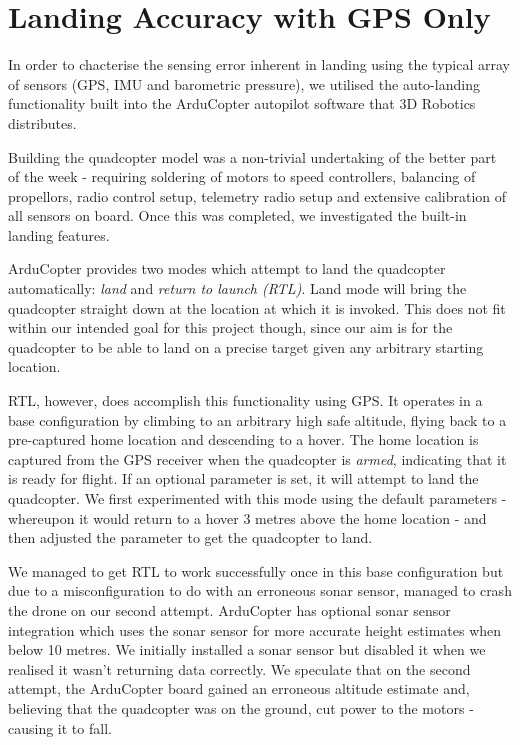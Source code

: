 \documentclass[10pt, twocolumn]{scrartcl} %
\begin{document}
\section{Landing Accuracy with GPS Only}

In order to chacterise the sensing error inherent in landing using the typical array of sensors (GPS, IMU and barometric pressure), we utilised the auto-landing functionality built into the ArduCopter autopilot software that 3D Robotics distributes. 

Building the quadcopter model was a non-trivial undertaking of the better part of the week - requiring soldering of motors to speed controllers, balancing of propellors, radio control setup, telemetry radio setup and extensive calibration of all sensors on board. Once this was completed, we investigated the built-in landing features.

ArduCopter provides two modes which attempt to land the quadcopter automatically: \textit{land} and  \textit{return to launch (RTL)}. Land mode will bring the quadcopter straight down at the location at which it is invoked. This does not fit within our intended goal for this project though, since our aim is for the quadcopter to be able to land on a precise target given any arbitrary starting location.

RTL, however, does accomplish this functionality using GPS. It operates in a base configuration by climbing to an arbitrary high safe altitude, flying back to a pre-captured home location and descending to a hover. The home location is captured from the GPS receiver when the quadcopter is \textit{armed}, indicating that it is ready for flight. If an optional parameter is set, it will attempt to land the quadcopter. We first experimented with this mode using the default parameters - whereupon it would return to a hover 3 metres above the home location - and then adjusted the parameter to get the quadcopter to land.

We managed to get RTL to work successfully once in this base configuration but due to a misconfiguration to do with an erroneous sonar sensor, managed to crash the drone on our second attempt. ArduCopter has optional sonar sensor integration which uses the sonar sensor for more accurate height estimates when below 10 metres. We initially installed a sonar sensor but disabled it when we realised it wasn't returning data correctly. We speculate that on the second attempt, the ArduCopter board gained an erroneous altitude estimate and, believing that the quadcopter was on the ground, cut power to the motors - causing it to fall.
\end{document}
